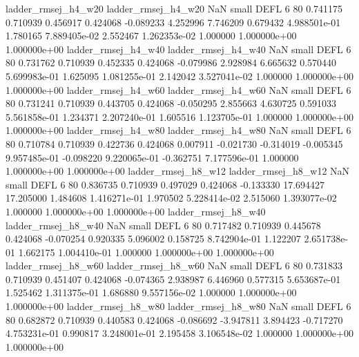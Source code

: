      ladder_rmsej_h4_w20      ladder_rmsej_h4_w20                   NaN      small     DEFL                 6 80 0.741175       0.710939 0.456917       0.424068   -0.089233      4.252996      7.746209     0.679432   4.988501e-01  1.780165 7.889405e-02     2.552467   1.262353e-02            1.000000    1.000000e+00        1.000000e+00
     ladder_rmsej_h4_w40      ladder_rmsej_h4_w40                   NaN      small     DEFL                 6 80 0.731762       0.710939 0.452335       0.424068   -0.079986      2.928984      6.665632     0.570440   5.699983e-01  1.625095 1.081255e-01     2.142042   3.527041e-02            1.000000    1.000000e+00        1.000000e+00
     ladder_rmsej_h4_w60      ladder_rmsej_h4_w60                   NaN      small     DEFL                 6 80 0.731241       0.710939 0.443705       0.424068   -0.050295      2.855663      4.630725     0.591033   5.561858e-01  1.234371 2.207240e-01     1.605516   1.123705e-01            1.000000    1.000000e+00        1.000000e+00
     ladder_rmsej_h4_w80      ladder_rmsej_h4_w80                   NaN      small     DEFL                 6 80 0.710784       0.710939 0.422736       0.424068    0.007911     -0.021730     -0.314019    -0.005345   9.957485e-01 -0.098220 9.220065e-01    -0.362751   7.177596e-01            1.000000    1.000000e+00        1.000000e+00
     ladder_rmsej_h8_w12      ladder_rmsej_h8_w12                   NaN      small     DEFL                 6 80 0.836735       0.710939 0.497029       0.424068   -0.133330     17.694427     17.205000     1.484608   1.416271e-01  1.970502 5.228414e-02     2.515060   1.393077e-02            1.000000    1.000000e+00        1.000000e+00
     ladder_rmsej_h8_w40      ladder_rmsej_h8_w40                   NaN      small     DEFL                 6 80 0.717482       0.710939 0.445678       0.424068   -0.070254      0.920335      5.096002     0.158725   8.742904e-01  1.122207 2.651738e-01     1.662175   1.004410e-01            1.000000    1.000000e+00        1.000000e+00
     ladder_rmsej_h8_w60      ladder_rmsej_h8_w60                   NaN      small     DEFL                 6 80 0.731833       0.710939 0.451407       0.424068   -0.074365      2.938987      6.446960     0.577315   5.653687e-01  1.525462 1.311375e-01     1.686880   9.557156e-02            1.000000    1.000000e+00        1.000000e+00
     ladder_rmsej_h8_w80      ladder_rmsej_h8_w80                   NaN      small     DEFL                 6 80 0.682872       0.710939 0.440583       0.424068   -0.086692     -3.947811      3.894423    -0.717270   4.753231e-01  0.990817 3.248001e-01     2.195458   3.106548e-02            1.000000    1.000000e+00        1.000000e+00
